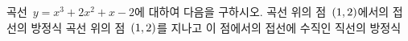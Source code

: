 곡선~$y=x^3+2x^2+x-2$에 대하여 다음을 구하시오.
 곡선 위의 점~$(1{,}\mkern3mu\mathopen{}2)$에서의 접선의 방정식
 곡선 위의 점~$(1{,}\mkern3mu\mathopen{}2)$를 지나고 이 점에서의 접선에 수직인 직선의 방정식
